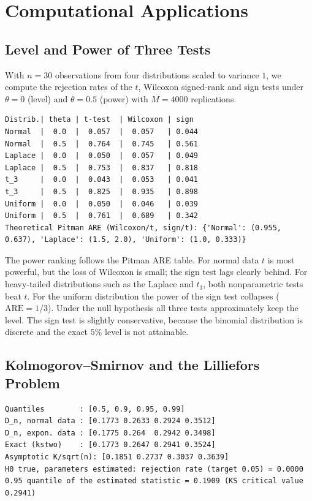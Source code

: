 \documentclass[main.tex]{subfiles}
\begin{document}
\section{Computational Applications}

\subsection{Level and Power of Three Tests}
With $n=30$ observations from four distributions scaled to variance $1$, we compute the rejection rates of the $t$, Wilcoxon signed-rank and sign tests under $\theta=0$ (level) and $\theta=0.5$ (power) with $M=4000$ replications.

\begin{lstlisting}[style=output]
Distrib.| theta | t-test  | Wilcoxon | sign
Normal  |  0.0  |  0.057  |  0.057   | 0.044
Normal  |  0.5  |  0.764  |  0.745   | 0.561
Laplace |  0.0  |  0.050  |  0.057   | 0.049
Laplace |  0.5  |  0.753  |  0.837   | 0.818
t_3     |  0.0  |  0.043  |  0.053   | 0.041
t_3     |  0.5  |  0.825  |  0.935   | 0.898
Uniform |  0.0  |  0.050  |  0.046   | 0.039
Uniform |  0.5  |  0.761  |  0.689   | 0.342
Theoretical Pitman ARE (Wilcoxon/t, sign/t): {'Normal': (0.955, 0.637), 'Laplace': (1.5, 2.0), 'Uniform': (1.0, 0.333)}
\end{lstlisting}

The power ranking follows the Pitman ARE table. For normal data $t$ is most powerful, but the loss of Wilcoxon is small; the sign test lags clearly behind. For heavy-tailed distributions such as the Laplace and $t_3$, both nonparametric tests beat $t$. For the uniform distribution the power of the sign test collapses ($\mathrm{ARE}=1/3$). Under the null hypothesis all three tests approximately keep the level. The sign test is slightly conservative, because the binomial distribution is discrete and the exact $5\%$ level is not attainable.

\subsection{Kolmogorov--Smirnov and the Lilliefors Problem}

\begin{lstlisting}[style=output]
Quantiles        : [0.5, 0.9, 0.95, 0.99]
D_n, normal data : [0.1773 0.2633 0.2924 0.3512]
D_n, expon. data : [0.1775 0.264  0.2942 0.3498]
Exact (kstwo)    : [0.1773 0.2647 0.2941 0.3524]
Asymptotic K/sqrt(n): [0.1851 0.2737 0.3037 0.3639]
H0 true, parameters estimated: rejection rate (target 0.05) = 0.0000
0.95 quantile of the estimated statistic = 0.1909 (KS critical value 0.2941)
\end{lstlisting}
\end{document}
